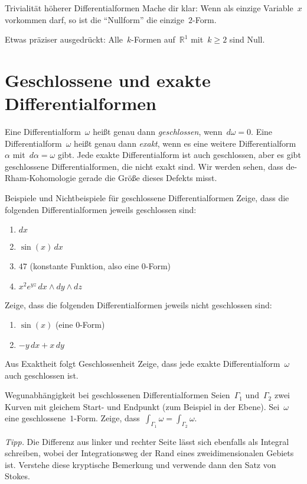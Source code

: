 \documentclass[twoside]{zirkelblatt1415}
\theoremstyle{definition}
\theoremstyle{plain}
\theoremstyle{remark}
\newcommand{\RR}{\mathbb{R}}
\begin{document}
\begin{aufgabe}{Trivialität höherer Differentialformen}
Mache dir klar: Wenn als einzige Variable~$x$ vorkommen darf, so ist die
"`Nullform"' die einzige~$2$-Form.

Etwas präziser ausgedrückt: Alle~$k$-Formen auf~$\RR^1$ mit~$k \geq 2$ sind
Null.
\end{aufgabe}


\section{Geschlossene und exakte Differentialformen}

Eine Differentialform~$\omega$ heißt genau dann \emph{geschlossen},
wenn~$d\omega = 0$. Eine Differentialform~$\omega$ heißt genau dann
\emph{exakt}, wenn es eine weitere Differentialform~$\alpha$ mit~$d\alpha =
\omega$ gibt. Jede exakte Differentialform ist auch geschlossen, aber es gibt
geschlossene Differentialformen, die nicht exakt sind. Wir werden sehen, dass
de-Rham-Kohomologie gerade die Größe dieses Defekts misst.

\begin{aufgabe}{Beispiele und Nichtbeispiele für geschlossene
Differentialformen}
Zeige, dass die folgenden Differentialformen jeweils geschlossen sind:
\begin{enumerate}
\item $dx$
\item $\sin(x)\,dx$
\item $47$ (konstante Funktion, also eine $0$-Form)
\item $x^2 e^{yz}\,dx \wedge dy \wedge dz$
\end{enumerate}
Zeige, dass die folgenden Differentialformen jeweils nicht geschlossen sind:
\begin{enumerate}
\addtocounter{enumi}{4}
\item $\sin(x)$ (eine $0$-Form)
\item $-y\,dx + x\,dy$
\end{enumerate}
\end{aufgabe}

\begin{aufgabe}{Aus Exaktheit folgt Geschlossenheit}
Zeige, dass jede exakte Differentialform~$\omega$ auch geschlossen ist.
\end{aufgabe}

\begin{aufgabe}{Wegunabhängigkeit bei geschlossenen Differentialformen}
Seien~$\Gamma_1$ und~$\Gamma_2$ zwei Kurven mit gleichem Start- und Endpunkt
(zum Beispiel in der Ebene). Sei~$\omega$ eine geschlossene~$1$-Form. Zeige,
dass~$\int_{\Gamma_1} \omega = \int_{\Gamma_2} \omega$.

\emph{Tipp.} Die Differenz aus linker und rechter Seite lässt sich ebenfalls
als Integral schreiben, wobei der Integrationsweg der Rand eines
zweidimensionalen Gebiets ist. Verstehe diese kryptische Bemerkung und verwende
dann den Satz von Stokes.
\end{aufgabe}
\end{document}
